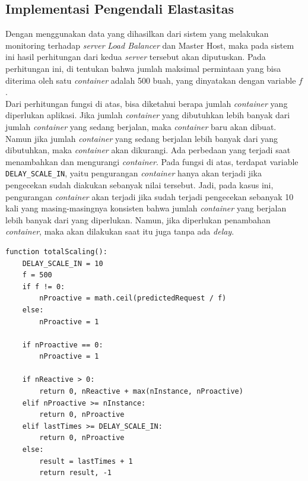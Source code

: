         \subsection{Implementasi Pengendali Elastasitas}
            Dengan menggunakan data yang dihasilkan dari sistem yang melakukan monitoring terhadap \textit{server} \textit{Load Balancer} dan Master Host, maka pada sistem ini hasil perhitungan dari kedua \textit{server} tersebut akan diputuskan. Pada perhitungan ini, di tentukan bahwa jumlah maksimal permintaan yang bisa diterima oleh satu \textit{container} adalah 500 buah, yang dinyatakan dengan variable $f$. \\
            \indent Dari perhitungan fungsi di atas, bisa diketahui berapa jumlah \textit{container} yang diperlukan aplikasi. Jika jumlah \textit{container} yang dibutuhkan lebih banyak dari jumlah \textit{container} yang sedang berjalan, maka \textit{container} baru akan dibuat. Namun jika jumlah \textit{container} yang sedang berjalan lebih banyak dari yang dibutuhkan, maka \textit{container} akan dikurangi. Ada perbedaan yang terjadi saat menambahkan dan mengurangi \textit{container}. Pada fungsi di atas, terdapat variable \texttt{DELAY\_SCALE\_IN}, yaitu pengurangan \textit{container} hanya akan terjadi jika pengecekan sudah diakukan sebanyak nilai tersebut. Jadi, pada kasus ini, pengurangan \textit{container} akan terjadi jika sudah terjadi pengecekan sebanyak 10 kali yang masing-masingnya konsisten bahwa jumlah \textit{container} yang berjalan lebih banyak dari yang diperlukan. Namun, jika diperlukan penambahan \textit{container}, maka akan dilakukan saat itu juga tanpa ada \textit{delay}.
            \begin{lstlisting}[frame=single,tabsize=2,breaklines,caption={Perhitungan \textit{Reactive Model}},label=calreactivemodel, captionpos=b]
function totalScaling():
    DELAY_SCALE_IN = 10
    f = 500
    if f != 0:
        nProactive = math.ceil(predictedRequest / f)
    else:
        nProactive = 1

    if nProactive == 0:
        nProactive = 1

    if nReactive > 0:
        return 0, nReactive + max(nInstance, nProactive)
    elif nProactive >= nInstance:
        return 0, nProactive
    elif lastTimes >= DELAY_SCALE_IN:
        return 0, nProactive
    else:
        result = lastTimes + 1
        return result, -1
			\end{lstlisting}
